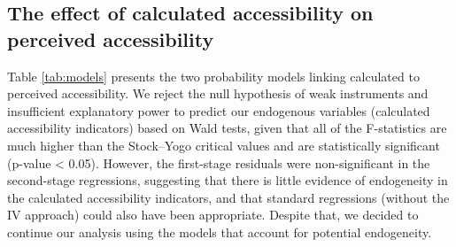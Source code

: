 \documentclass[preprint, 3p,
authoryear]{elsarticle} %
\begin{document}
\subsection{The effect of calculated accessibility on perceived
accessibility}\label{the-effect-of-calculated-accessibility-on-perceived-accessibility}

Table \ref{tab:models} presents the two probability models linking
calculated to perceived accessibility. We reject the null hypothesis of
weak instruments and insufficient explanatory power to predict our
endogenous variables (calculated accessibility indicators) based on Wald
tests, given that all of the F-statistics are much higher than the
Stock--Yogo critical values and are statistically significant (p-value
\textless{} 0.05). However, the first-stage residuals were
non-significant in the second-stage regressions, suggesting that there
is little evidence of endogeneity in the calculated accessibility
indicators, and that standard regressions (without the IV approach)
could also have been appropriate. Despite that, we decided to continue
our analysis using the models that account for potential endogeneity.
\end{document}
